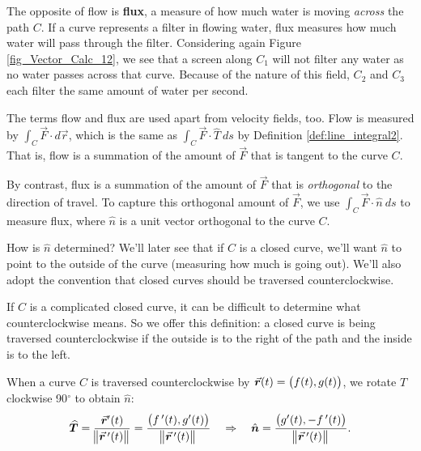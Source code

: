 The opposite of flow is \textbf{flux}, a measure of how much water is moving \textit{across} the path $C$. If a curve represents a filter in flowing water, flux measures how much water will pass through the filter. Considering again Figure \ref{fig_Vector_Calc_12}, we see that a screen along $C_1$ will not filter any water as no water passes across that curve. Because of the nature of this field,  $C_2$ and $C_3$ each filter the same amount of water per second. 

	\checkoddpage
{}
The terms flow and flux are used apart from velocity fields, too. Flow is measured by $\int_C \vec F\cdot d\vec r$, which is the same as $\int_C \vec F\cdot\widehat T\ ds$ by Definition \ref{def:line_integral2}. That is, flow is a summation of the amount of $\vec F$ that is tangent to the curve $C$. 

By contrast, flux is a summation of the amount of $\vec F$ that is \textit{orthogonal} to the direction of travel. To capture this orthogonal amount of $\vec F$, we use $\int_C \vec F \cdot \hat n\ ds$ to measure flux, where $\hat n$ is a unit vector orthogonal to the curve $C$. 

How is $\hat n$ determined? We'll later see that if $C$ is a closed curve, we'll want $\hat n$ to point to the outside of the curve (measuring how much is going out). We'll also adopt the convention that closed curves should be traversed counterclockwise. 

If $C$ is a complicated closed curve, it can be difficult to determine what counterclockwise means.  So we offer this definition: a closed curve is being traversed counterclockwise if the outside is to the right of the path and the inside is to the left.

When a curve $C$ is traversed counterclockwise by $\vrt = \left( f(t), g(t)\right)$, we rotate $\widehat T$ clockwise 90$^\circ$  to obtain $\hat n$:
$$\widehat T =\frac{\vec{r}'(t)}{\norm{\vrp(t)}}= \frac{\left( \fp(t),g'(t)\right)}{\norm{\vrp(t)}} \quad \Rightarrow \quad \hat n = \frac{\left( g'(t),-\fp(t)\right)}{\norm{\vrp(t)}}.$$

